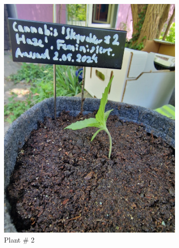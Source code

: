 \begin{figure}[htbp]
    \begin{subfigure}[t]{.19\textwidth}
        \includegraphics[width=\linewidth]{plant_02_2024-05-13}
        \caption{Plant \# 2}
        \label{fig:plant_02_2024-05-13}
    \end{subfigure}
    \begin{subfigure}[t]{.19\textwidth}

\end{subfigure}
\end{figure}
